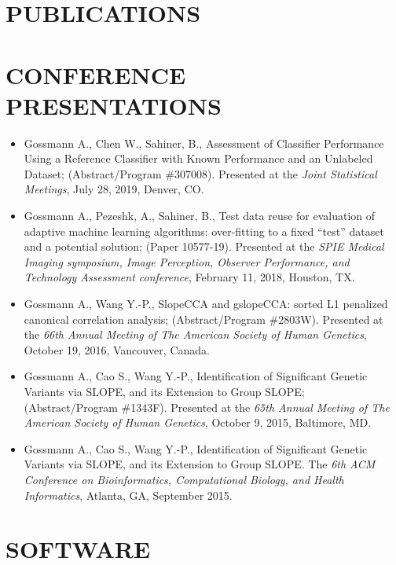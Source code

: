 \documentclass[overlapped, line, 10pt]{res} %
\begin{document}
\begin{resume}

\section{PUBLICATIONS}

\nocite{*}




\section{CONFERENCE PRESENTATIONS}

\begin{itemize}
  \item
    Gossmann A., Chen W., Sahiner, B., Assessment of Classifier Performance Using a Reference Classifier with Known Performance and an Unlabeled Dataset;
    (Abstract/Program \#307008).
    Presented at the \textit{Joint Statistical Meetings},
    July 28, 2019, Denver, CO.
  \item
    Gossmann A., Pezeshk, A., Sahiner, B., Test data reuse for evaluation of adaptive machine learning algorithms: over-fitting to a fixed ``test'' dataset and a potential solution;
    (Paper 10577-19).
    Presented at the \textit{SPIE Medical Imaging symposium, Image Perception, Observer Performance, and Technology Assessment conference},
    February 11, 2018, Houston, TX.
  \item
    Gossmann A., Wang Y.-P., SlopeCCA and gslopeCCA: sorted L1 penalized canonical correlation analysis;
    (Abstract/Program \#2803W).
    Presented at the \textit{66th Annual Meeting of The American Society of Human Genetics},
    October 19, 2016, Vancouver, Canada.
  \item
    Gossmann A., Cao S., Wang Y.-P., Identification of Significant Genetic Variants via SLOPE, and its Extension to Group SLOPE;
    (Abstract/Program \#1343F).
    Presented at the \textit{65th Annual Meeting of The American Society of Human Genetics},
    October 9, 2015, Baltimore, MD.
  \item
    Gossmann A., Cao S., Wang Y.-P., Identification of Significant Genetic Variants via SLOPE, and its Extension to Group SLOPE.
    The \textit{6th ACM Conference on Bioinformatics, Computational Biology, and Health Informatics},
    Atlanta, GA, September 2015.
\end{itemize}


\section{SOFTWARE}


\end{resume}
\end{document}

